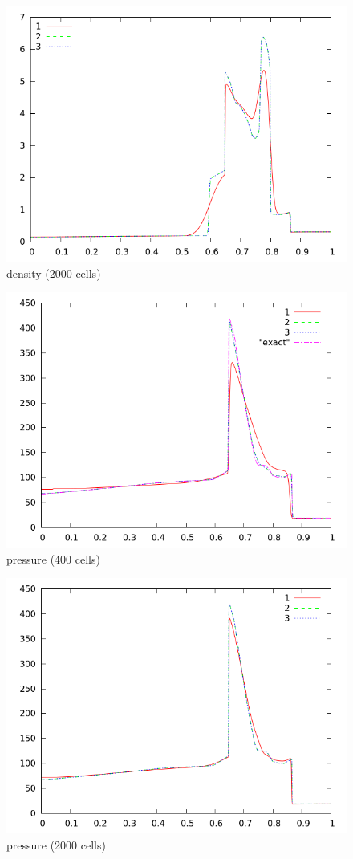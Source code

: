 \documentclass[10pt,preprint]{aastex}
\begin{document}
\begin{figure}[h]
  \begin{center}
     \includegraphics[width=.78\textwidth]{den_T12_2000.png}	
  \end{center}
  \caption{density (2000 cells)}
\end{figure}

\begin{figure}[h]
  \begin{center}
     \includegraphics[width=.78\textwidth]{prs_T12_400.png}	
  \end{center}
  \caption{pressure (400 cells)}
\end{figure}

\begin{figure}[h]
  \begin{center}
     \includegraphics[width=.78\textwidth]{prs_T12_2000.png}	
  \end{center}
  \caption{pressure (2000 cells)}
\end{figure}
\end{document}
